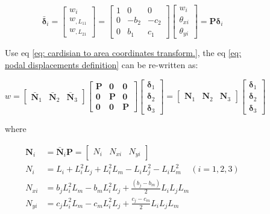 \begin{figure}[h!]
\begin{equation}\label{eq: cardisian to area coordinates transform.}
\bar{\mathbf{\delta}}_i = \begin{bmatrix}
w_i \\ 
w_{,L_{11}} \\ 
w_{,L_{21}}
\end{bmatrix} = \begin{bmatrix}
1 & 0 & 0 \\ 
0 & -b_2 & -c_2 \\ 
0 & b_1 & c_1
\end{bmatrix} \begin{bmatrix}
w_i \\ 
\theta_{xi} \\ 
\theta_{yi}
\end{bmatrix} = \mathbf{P} \mathbf{\delta}_i
\end{equation}

Use eq \ref{eq: cardisian to area coordinates transform.}, the eq \ref{eq: nodal displacements definition} can be re-written as:

\begin{equation}\label{key}
w = \begin{bmatrix}
\bar{\mathbf{N}}_1 & \bar{\mathbf{N}}_2 & \bar{\mathbf{N}}_3
\end{bmatrix} \begin{bmatrix}
\mathbf{P} & \mathbf{0} & \mathbf{0} \\ 
\mathbf{0} & \mathbf{P} & \mathbf{0} \\ 
\mathbf{0} & \mathbf{0} & \mathbf{P}
\end{bmatrix} \begin{bmatrix}
\mathbf{\delta}_1 \\ 
\mathbf{\delta}_2 \\ 
\mathbf{\delta}_3
\end{bmatrix} = \begin{bmatrix}
\mathbf{N}_1 & \mathbf{N}_2 & \mathbf{N}_3
\end{bmatrix} \begin{bmatrix}
\mathbf{\delta}_1 \\ 
\mathbf{\delta}_2 \\ 
\mathbf{\delta}_3
\end{bmatrix}
\end{equation}

where

\begin{align*}\label{eq: shape function in area coordinates for bending plate}
\mathbf{N}_i &= \bar{\mathbf{N}}_i \mathbf{P} = \begin{bmatrix}
N_i & N_{xi} & N_{yi}
\end{bmatrix}\\
N_i &= L_i + L_i^2 L_j + L_i^2 L_m - L_i L_j^2 - L_i L_m^2  ~~~~~(i=1,2,3) \\
N_{xi} &= b_j L_i^2 L_m - b_m L_i^2 L_j + \frac{(b_j-b_m)}{2}L_i L_j L_m \\
N_{yi} &= c_j L_i^2 L_m - c_m L_i^2 L_j + \frac{c_j - c_m}{2} L_i L_j L_m
\end{align*}


\end{figure}

